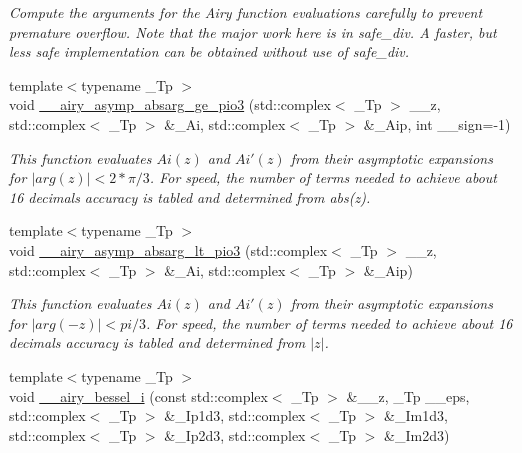 \begin{DoxyCompactItemize}
\begin{DoxyCompactList}\small\item\em Compute the arguments for the Airy function evaluations carefully to prevent premature overflow. Note that the major work here is in {\ttfamily safe\+\_\+div}. A faster, but less safe implementation can be obtained without use of safe\+\_\+div. \end{DoxyCompactList}\item 
{\footnotesize template$<$typename \+\_\+\+Tp $>$ }\\void \hyperlink{namespacestd_1_1____detail_a026a02e51a93428332a607c093e8204f}{\+\_\+\+\_\+airy\+\_\+asymp\+\_\+absarg\+\_\+ge\+\_\+pio3} (std\+::complex$<$ \+\_\+\+Tp $>$ \+\_\+\+\_\+z, std\+::complex$<$ \+\_\+\+Tp $>$ \&\+\_\+\+Ai, std\+::complex$<$ \+\_\+\+Tp $>$ \&\+\_\+\+Aip, int \+\_\+\+\_\+sign=-\/1)
\begin{DoxyCompactList}\small\item\em This function evaluates $ Ai(z) $ and $ Ai'(z) $ from their asymptotic expansions for $ |arg(z)| < 2*\pi/3 $. For speed, the number of terms needed to achieve about 16 decimals accuracy is tabled and determined from abs(z). \end{DoxyCompactList}\item 
{\footnotesize template$<$typename \+\_\+\+Tp $>$ }\\void \hyperlink{namespacestd_1_1____detail_a4f1c33b398ae69c55281341004da0679}{\+\_\+\+\_\+airy\+\_\+asymp\+\_\+absarg\+\_\+lt\+\_\+pio3} (std\+::complex$<$ \+\_\+\+Tp $>$ \+\_\+\+\_\+z, std\+::complex$<$ \+\_\+\+Tp $>$ \&\+\_\+\+Ai, std\+::complex$<$ \+\_\+\+Tp $>$ \&\+\_\+\+Aip)
\begin{DoxyCompactList}\small\item\em This function evaluates $ Ai(z) $ and $ Ai'(z) $ from their asymptotic expansions for $ |arg(-z)| < pi/3 $. For speed, the number of terms needed to achieve about 16 decimals accuracy is tabled and determined from $ |z| $. \end{DoxyCompactList}\item 
{\footnotesize template$<$typename \+\_\+\+Tp $>$ }\\void \hyperlink{namespacestd_1_1____detail_aee6c743187765ce9a1f9c4c9af4acf17}{\+\_\+\+\_\+airy\+\_\+bessel\+\_\+i} (const std\+::complex$<$ \+\_\+\+Tp $>$ \&\+\_\+\+\_\+z, \+\_\+\+Tp \+\_\+\+\_\+eps, std\+::complex$<$ \+\_\+\+Tp $>$ \&\+\_\+\+Ip1d3, std\+::complex$<$ \+\_\+\+Tp $>$ \&\+\_\+\+Im1d3, std\+::complex$<$ \+\_\+\+Tp $>$ \&\+\_\+\+Ip2d3, std\+::complex$<$ \+\_\+\+Tp $>$ \&\+\_\+\+Im2d3)

\end{DoxyCompactItemize}
